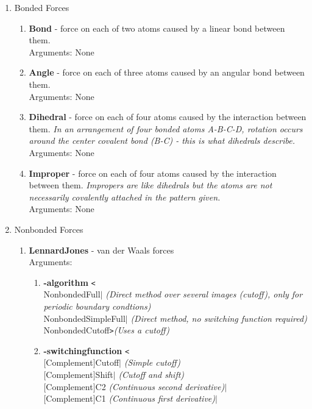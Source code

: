 \documentclass[11pt]{report}
\newcommand{\tempstart}{\texttt{<}}
\newcommand{\tempend}{\texttt{>}}
\begin{document}
\begin{enumerate}
\item Bonded Forces
  \begin{enumerate}
  \item {\bf Bond} - force on each of two atoms caused by a linear bond between them.\\
    Arguments: None
  \item {\bf Angle} - force on each of three atoms caused by an angular bond between them.\\
    Arguments: None
  \item {\bf Dihedral} - force on each of four atoms caused by the interaction between them.
    {\it In an arrangement of four bonded atoms A-B-C-D, rotation occurs
      around the center covalent bond (B-C) - this is what dihedrals describe. ~\cite{Topoxx}}\\
    Arguments: None
  \item {\bf Improper} - force on each of four atoms caused by the interaction between them.
    {\it Impropers are like dihedrals but the atoms are not necessarily covalently attached in the
      pattern given. ~\cite{Topoxx}\\}
    Arguments: None
  \end{enumerate}
\item Nonbonded Forces
  \begin{enumerate}
  \item {\bf LennardJones} - van der Waals forces\\
    Arguments:
    \begin{enumerate}
    \item {\bf -algorithm} \tempstart \\
      NonbondedFull$|$ {\it (Direct method over several images (cutoff),
        only for periodic boundary condtions)}\\
      NonbondedSimpleFull$|$ {\it (Direct method, no switching function required)}\\
      NonbondedCutoff\tempend  {\it (Uses a cutoff)}
    \item {\bf -switchingfunction} \tempstart \\
      $[$Complement$]$Cutoff$|$ {\it (Simple cutoff)}\\
      $[$Complement$]$Shift$|$ {\it (Cutoff and shift)} \\
      $[$Complement$]$C2 {\it (Continuous second derivative)}$|$\\
      $[$Complement$]$C1 {\it (Continuous first derivative)}$|$\\

\end{enumerate}
\end{enumerate}
\end{enumerate}
\end{document}
